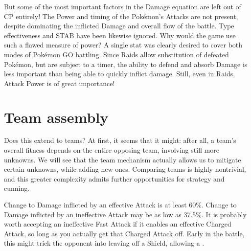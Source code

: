 But some of the most important factors in the Damage equation are left
  out of CP entirely!
The Power and timing of the Pokémon's Attacks are not present, despite
  dominating the inflicted Damage and overall flow of the battle.
Type effectiveness and STAB have been likewise ignored.
Why would the game use such a flawed measure of power?
A single stat was clearly desired to cover both modes of Pokémon GO battling.
Since Raids allow substitution of defeated Pokémon, but are subject to a timer,
  the ability to defend and absorb Damage is less important than being able to
  quickly inflict damage.
Still, even in Raids, Attack Power is of great importance!

\section{Team assembly}
Does this extend to teams?
At first, it seems that it might: after all, a team's overall fitness
 depends on the entire opposing team, involving still more unknowns.
We will see that the team mechanism actually allows us to mitigate certain
 unknowns, while adding new ones.
Comparing teams is highly nontrivial, and this greater complexity admits
 further opportunities for strategy and cunning.

Change to Damage inflicted by an effective Attack is at least 60\%.
Change to Damage inflicted by an ineffective Attack may be as
 low as 37.5\%.
It is probably worth accepting an ineffective Fast Attack if it
 enables an effective Charged Attack, so long as you actually
 get that Charged Attack off.
Early in the battle, this might trick the opponent into leaving
 off a Shield, allowing a .
